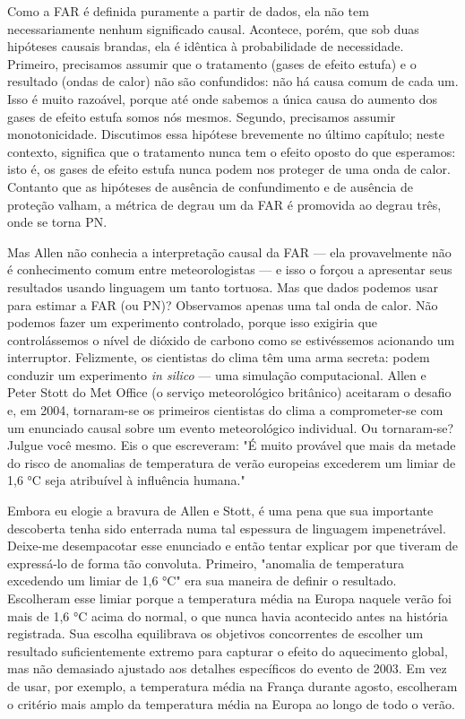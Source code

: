 \documentclass[11pt,a5paper,twoside]{book}
\begin{document}
Como a FAR é definida puramente a partir de dados, ela não tem necessariamente nenhum significado causal. Acontece, porém, que sob duas hipóteses causais brandas, ela é idêntica à probabilidade de necessidade. Primeiro, precisamos assumir que o tratamento (gases de efeito estufa) e o resultado (ondas de calor) não são confundidos: não há causa comum de cada um. Isso é muito razoável, porque até onde sabemos a única causa do aumento dos gases de efeito estufa somos nós mesmos. Segundo, precisamos assumir monotonicidade. Discutimos essa hipótese brevemente no último capítulo; neste contexto, significa que o tratamento nunca tem o efeito oposto do que esperamos: isto é, os gases de efeito estufa nunca podem nos proteger de uma onda de calor. Contanto que as hipóteses de ausência de confundimento e de ausência de proteção valham, a métrica de degrau um da FAR é promovida ao degrau três, onde se torna PN.

Mas Allen não conhecia a interpretação causal da FAR — ela provavelmente não é conhecimento comum entre meteorologistas — e isso o forçou a apresentar seus resultados usando linguagem um tanto tortuosa. Mas que dados podemos usar para estimar a FAR (ou PN)? Observamos apenas uma tal onda de calor. Não podemos fazer um experimento controlado, porque isso exigiria que controlássemos o nível de dióxido de carbono como se estivéssemos acionando um interruptor. Felizmente, os cientistas do clima têm uma arma secreta: podem conduzir um experimento \textit{in silico} — uma simulação computacional. Allen e Peter Stott do Met Office (o serviço meteorológico britânico) aceitaram o desafio e, em 2004, tornaram-se os primeiros cientistas do clima a comprometer-se com um enunciado causal sobre um evento meteorológico individual. Ou tornaram-se? Julgue você mesmo. Eis o que escreveram: "É muito provável que mais da metade do risco de anomalias de temperatura de verão europeias excederem um limiar de 1,6 °C seja atribuível à influência humana."

Embora eu elogie a bravura de Allen e Stott, é uma pena que sua importante descoberta tenha sido enterrada numa tal espessura de linguagem impenetrável. Deixe-me desempacotar esse enunciado e então tentar explicar por que tiveram de expressá-lo de forma tão convoluta. Primeiro, "anomalia de temperatura excedendo um limiar de 1,6 °C" era sua maneira de definir o resultado. Escolheram esse limiar porque a temperatura média na Europa naquele verão foi mais de 1,6 °C acima do normal, o que nunca havia acontecido antes na história registrada. Sua escolha equilibrava os objetivos concorrentes de escolher um resultado suficientemente extremo para capturar o efeito do aquecimento global, mas não demasiado ajustado aos detalhes específicos do evento de 2003. Em vez de usar, por exemplo, a temperatura média na França durante agosto, escolheram o critério mais amplo da temperatura média na Europa ao longo de todo o verão.
\end{document}
